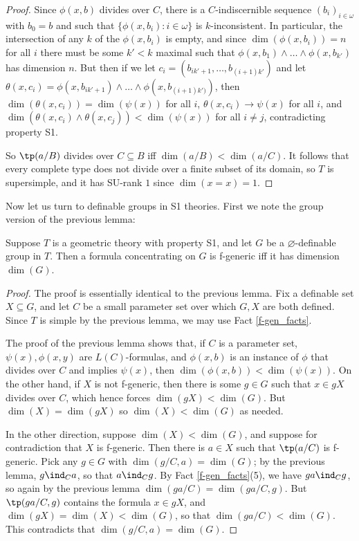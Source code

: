 \documentclass[10pt]{article}
\begin{document}
{\begin{proof}
    Since $\phi(x,b)$ divides over $C$, there is a $C$-indiscernible sequence $(b_i)_{i\in\omega}$ with $b_0=b$ and such that $\{\phi(x,b_i):i\in\omega\}$ is $k$-inconsistent. In particular, the intersection of any $k$ of the $\phi(x,b_i)$ is empty, and since $\dim(\phi(x,b_i))=n$ for all $i$ there must be some $k'<k$ maximal such that $\phi(x,b_1)\wedge\dots\wedge\phi(x,b_{k'})$ has dimension $n$. But then if we let $c_i=(b_{ik'+1},\dots,b_{(i+1)k'})$ and let $\theta(x,c_i)=\phi(x,b_{ik'+1})\wedge\dots\wedge \phi(x,b_{(i+1)k')})$, then $\dim(\theta(x,c_i))=\dim(\psi(x))$ for all $i$, $\theta(x,c_i)\to\psi(x)$ for all $i$, and $\dim(\theta(x,c_i)\wedge\theta(x,c_j))<\dim(\psi(x))$ for all $i\neq j$, contradicting property S1.

    So $\tp(a/B)$ divides over $C\subseteq B$ iff $\dim(a/B)<\dim(a/C)$. It follows that every complete type does not divide over a finite subset of its domain, so $T$ is supersimple, and it has SU-rank $1$ since $\dim(x=x)=1$.
    \end{proof}

Now let us turn to definable groups in S1 theories. First we note the group version of the previous lemma:
\begin{lemma}\label{f-gen_iff_max_dim}
    Suppose $T$ is a geometric theory with property S1, and let $G$ be a $\varnothing$-definable group in $T$. Then a formula concentrating on $G$ is f-generic iff it has dimension $\dim(G)$.
\end{lemma}
\begin{proof}
    The proof is essentially identical to the previous lemma. Fix a definable set $X\subseteq G$, and let $C$ be a small parameter set over which $G,X$ are both defined. Since $T$ is simple by the previous lemma, we may use Fact \ref{f-gen_facts}.
    
    The proof of the previous lemma shows that, if $C$ is a parameter set, $\psi(x),\phi(x,y)$ are $L(C)$-formulas, and $\phi(x,b)$ is an instance of $\phi$ that divides over $C$ and implies $\psi(x)$, then $\dim(\phi(x,b))<\dim(\psi(x))$. On the other hand, if $X$ is not f-generic, then there is some $g\in G$ such that $x\in gX$ divides over $C$, which hence forces $\dim(gX)<\dim(G)$. But $\dim(X)=\dim(gX)$ so $\dim(X)<\dim(G)$ as needed.
    
    In the other direction, suppose $\dim(X)<\dim(G)$, and suppose for contradiction that $X$ is f-generic. Then there is $a\in X$ such that $\tp(a/C)$ is f-generic. Pick any $g\in G$ with $\dim(g/C,a)=\dim(G)$; by the previous lemma, $g\ind_C a$, so that $a\ind_C g$. By Fact \ref{f-gen_facts}(5), we have $ga\ind_C g$, so again by the previous lemma $\dim(ga/C)=\dim(ga/C,g)$. But $\tp(ga/C,g)$ contains the formula $x\in gX$, and $\dim(gX)=\dim(X)<\dim(G)$, so that $\dim(ga/C)<\dim(G)$. This contradicts that $\dim(g/C,a)=\dim(G)$.
\end{proof}

}
\end{document}
